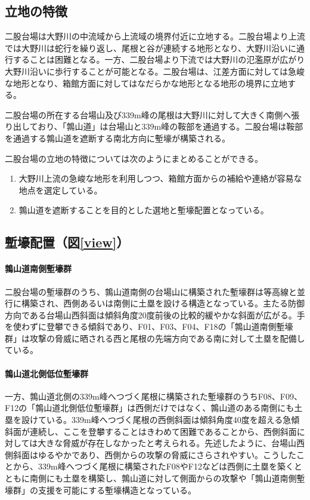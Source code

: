 \documentclass[14Q]{jsarticle}
\begin{document}
\subsection{立地の特徴}
二股台場は大野川の中流域から上流域の境界付近に立地する。二股台場より上流では大野川は蛇行を繰り返し、尾根と谷が連続する地形となり、大野川沿いに通行することは困難となる。一方、二股台場より下流では大野川の氾濫原が広がり大野川沿いに歩行することが可能となる。二股台場は、江差方面に対しては急峻な地形となり、箱館方面に対してはなだらかな地形となる地形の境界に立地する。

二股台場の所在する台場山及び339m峰の尾根は大野川に対して大きく南側へ張り出しており、「鶉山道」は台場山と339m峰の鞍部を通過する。二股台場は鞍部を通過する鶉山道を遮断する南北方向に塹壕が構築される。

二股台場の立地の特徴については次のようにまとめることができる。

\begin{enumerate}
\item 大野川上流の急峻な地形を利用しつつ、箱館方面からの補給や連絡が容易な地点を選定している。
\item 鶉山道を遮断することを目的とした選地と塹壕配置となっている。
\end{enumerate}

\subsection{塹壕配置（図\ref{view}）}
\paragraph{鶉山道南側塹壕群}
二股台場の塹壕群のうち、鶉山道南側の台場山に構築された塹壕群は等高線と並行に構築され、西側あるいは南側に土塁を設ける構造となっている。主たる防御方向である台場山西斜面は傾斜角度20度前後の比較的緩やかな斜面が広がる。手を使わずに登攀できる傾斜であり、F01、F03、F04、F18の「鶉山道南側塹壕群」は攻撃の脅威に晒される西と尾根の先端方向である南に対して土塁を配備している。

\paragraph{鶉山道北側低位塹壕群}
一方、鶉山道北側の339m峰へつづく尾根に構築された塹壕群のうちF08、F09、F12の「鶉山道北側低位塹壕群」は西側だけではなく、鶉山道のある南側にも土塁を設けている。339m峰へつづく尾根の西側斜面は傾斜角度40度を超える急傾斜面が連続し、ここを登攀することはきわめて困難であることから、西側斜面に対しては大きな脅威が存在しなかったと考えられる。先述したように、台場山西側斜面はゆるやかであり、西側からの攻撃の脅威にさらされやすい。こうしたことから、339m峰へつづく尾根に構築されたF08やF12などは西側に土塁を築くとともに南側にも土塁を構築し、鶉山道に対して側面からの攻撃や「鶉山道南側塹壕群」の支援を可能にする塹壕構造となっている。
\end{document}
